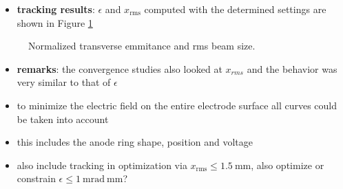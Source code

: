 %       
%       

\begin{itemize}
   \item \textbf{tracking results}: $\epsilon$ and $x_\mathrm{rms}$ computed with the determined settings are shown in Figure \ref{fig:astra_res}
\end{itemize}

\begin{center}
\begin{figure}[H]
   \begin{subfigure}{0.4\textwidth}
      
   \end{subfigure}
   \qquad \qquad \qquad
   \begin{subfigure}{0.4\textwidth}
      
   \end{subfigure}
   \caption{Normalized transverse emmitance and rms beam size.}
   \label{fig:astra_res}
\end{figure}
\end{center}

\begin{itemize}
   \item \textbf{remarks}: the convergence studies also looked at $x_{rms}$ and the behavior was very similar to that of $\epsilon$\\

   \item to minimize the electric field on the entire electrode surface all curves could be taken into account
   \item this includes the anode ring shape, position and voltage
   \item also include tracking in optimization via $x_\mathrm{rms} \leq 1.5\ \mathrm{mm}$, also optimize or constrain $\epsilon \leq 1\ \mathrm{mrad\ mm}$?
\end{itemize}
